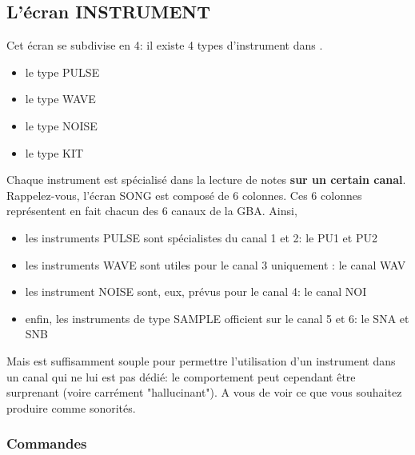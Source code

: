 \documentclass[12pt,a4paper]{article}
\begin{document}
    \subsection{L'écran INSTRUMENT}

    Cet écran se subdivise en 4: il existe 4 types d'instrument dans \FAT.\medskip

    \begin{itemize}
        \item{le type PULSE}
        \item{le type WAVE}
        \item{le type NOISE}
        \item{le type KIT}
    \end{itemize}\medskip

     Chaque instrument est spécialisé dans la lecture de notes {\bf sur un certain canal}. Rappelez-vous, l'écran SONG est composé de 6 colonnes. Ces 6 colonnes représentent en fait chacun des 6 canaux de la GBA. Ainsi,

     \begin{itemize}
        \item{les instruments PULSE sont spécialistes du canal 1 et 2: le PU1 et PU2}
        \item{les instruments WAVE sont utiles pour le canal 3 uniquement : le canal WAV}
        \item{les instrument NOISE sont, eux, prévus pour le canal 4: le canal NOI}
        \item{enfin, les instruments de type SAMPLE officient sur le canal 5 et 6: le SNA et SNB}
     \end{itemize}\medskip

     Mais \FAT est suffisamment souple pour permettre l'utilisation d'un instrument dans un canal qui ne lui est pas dédié: le comportement peut cependant être surprenant (voire carrément "hallucinant"). A vous de voir ce que vous souhaitez produire comme sonorités.

        \subsubsection{Commandes}
\end{document}
